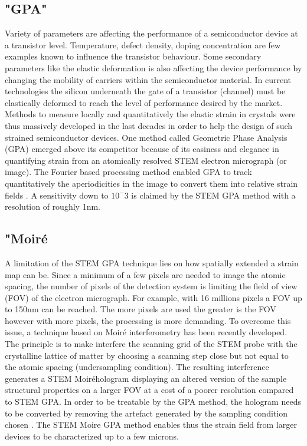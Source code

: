 \documentclass{article}
\begin{document}
\subsection{"GPA"}
Variety of parameters are affecting the performance of a semiconductor device at a transistor level. Temperature, defect density, doping concentration are few examples known to influence the transistor behaviour. Some secondary parameters like the elastic deformation is also affecting the device performance by changing the mobility of carriers within the semiconductor material. In current technologies the silicon underneath the gate of a transistor (channel) must be elastically deformed to reach the level of performance desired by the market. Methods to measure locally and quantitatively the elastic strain in crystals were thus massively developed in the last decades in order to help the design of such strained semiconductor devices. One method called Geometric Phase Analysis (GPA) emerged above its competitor because of its easiness and elegance in quantifying strain from an atomically resolved STEM electron micrograph (or image). The Fourier based processing method enabled GPA to track quantitatively the aperiodicities in the image to convert them into relative strain fields \cite{Hytch1998}. A sensitivity down to $10^-{3}$ is claimed by the STEM GPA method with a resolution of roughly 1nm.
\subsection{"Moir{\'e}}
A limitation of the STEM GPA technique lies on how spatially extended a strain map can be. Since a minimum of a few pixels are needed to image the atomic spacing, the number of pixels of the detection system is limiting the field of view (FOV) of the electron micrograph. For example, with 16 millions pixels a FOV up to 150nm can be reached. The more pixels are used the greater is the FOV however with more pixels, the processing is more demanding. To overcome this issue, a technique based on Moir{\'e} interferometry has been recently developed. The principle is to make interfere the scanning grid of the STEM probe with the crystalline lattice of matter by choosing a scanning step close but not equal to the atomic spacing (undersampling condition). The resulting interference generates a STEM Moir{\'e}hologram displaying an altered version of the sample structural properties on a larger FOV at a cost of a poorer resolution compared to STEM GPA. In order to be treatable by the GPA method, the hologram needs to be converted by removing the artefact generated by the sampling condition chosen \cite{Pofelski2017}. The STEM Moire GPA method enables thus the strain field from larger devices to be characterized up to a few microns.
\end{document}
